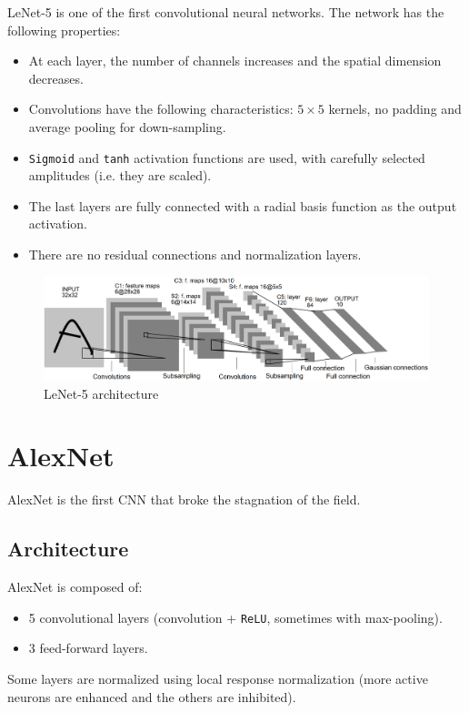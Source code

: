 LeNet-5 is one of the first convolutional neural networks.
The network has the following properties:
\begin{itemize}
    \item At each layer, the number of channels increases and the spatial dimension decreases.
    \item Convolutions have the following characteristics: $5 \times 5$ kernels, no padding and average pooling for down-sampling.
    \item \texttt{Sigmoid} and \texttt{tanh} activation functions are used, with carefully selected amplitudes (i.e. they are scaled).
    \item The last layers are fully connected with a radial basis function as the output activation.
    \item There are no residual connections and normalization layers.
\end{itemize}

\begin{figure}[H]
    \centering
    \includegraphics[width=0.7\linewidth]{./img/lenet5.png}
    \caption{LeNet-5 architecture}
\end{figure}



\section{AlexNet}

AlexNet is the first CNN that broke the stagnation of the field.


\subsection{Architecture}

AlexNet is composed of:
\begin{itemize}
    \item 5 convolutional layers (convolution + \texttt{ReLU}, sometimes with max-pooling).
    \item 3 feed-forward layers.
\end{itemize}

\begin{remark}
    Some layers are normalized using local response normalization (more active neurons are enhanced and the others are inhibited).
\end{remark}

